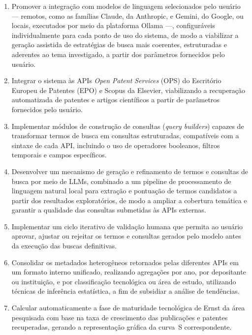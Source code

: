 \documentclass[12pt, a4paper]{article}
\begin{document}
  \begin{enumerate}[label=\roman*.]
    \item Promover a integração com modelos de linguagem selecionados pelo usuário --- remotos, como as famílias Claude, da Anthropic, e Gemini, do Google, ou locais, executados por meio da plataforma Ollama ---, configuráveis individualmente para cada ponto de uso do sistema, de modo a viabilizar a geração assistida de estratégias de busca mais coerentes, estruturadas e aderentes ao tema investigado, a partir dos parâmetros fornecidos pelo usuário.
    \item Integrar o sistema às APIs \textit{Open Patent Services} (OPS) do
    Escritório Europeu de Patentes (EPO) e Scopus da Elsevier, viabilizando a
    recuperação automatizada de patentes e artigos científicos a partir de
    parâmetros fornecidos pelo usuário.

    \item Implementar módulos de construção de consultas (\textit{query builders})
    capazes de transformar termos de busca em consultas estruturadas, compatíveis com
    a sintaxe de cada API, incluindo o uso de operadores booleanos, filtros
    temporais e campos específicos.

    \item Desenvolver um mecanismo de geração e refinamento de termos e consultas
    de busca por meio de LLMs, combinado a um pipeline de
    processamento de linguagem natural local para extração e pontuação de
    termos candidatos a partir dos resultados exploratórios, de modo a ampliar
    a cobertura temática e garantir a qualidade das consultas submetidas às
    APIs externas.

    \item Implementar um ciclo iterativo de validação humana que permita ao usuário
    aprovar, ajustar ou rejeitar os termos e consultas gerados pelo modelo antes da
    execução das buscas definitivas.

    \item Consolidar os metadados heterogêneos retornados pelas diferentes APIs
    em um formato interno unificado, realizando agregações por ano, por depositante
    ou instituição, e por classificação tecnológica ou área de estudo, utilizando técnicas de inferência estatística, a fim de subsidiar a análise de tendências.

    \item Calcular automaticamente a fase de maturidade tecnológica de Ernst da área
    pesquisada com base na taxa de crescimento das publicações e patentes
    recuperadas, gerando a representação gráfica da curva~S correspondente.


\end{enumerate}
\end{document}
